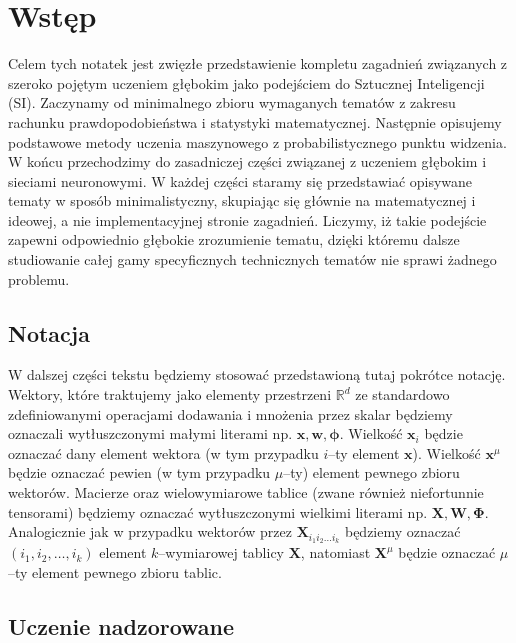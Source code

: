 \documentclass{myclass}
\numberwithin{equation}{subsection}
\begin{document}
\tableofcontents
\newpage

\section{Wstęp}

Celem tych notatek jest zwięzłe przedstawienie kompletu zagadnień związanych z szeroko pojętym
uczeniem głębokim jako podejściem do Sztucznej Inteligencji (SI). Zaczynamy od minimalnego zbioru
wymaganych tematów z zakresu rachunku prawdopodobieństwa i statystyki matematycznej. Następnie
opisujemy podstawowe metody uczenia maszynowego z probabilistycznego punktu widzenia. W końcu
przechodzimy do zasadniczej części związanej z uczeniem głębokim i sieciami neuronowymi. W każdej
części staramy się przedstawiać opisywane tematy w sposób minimalistyczny, skupiając się głównie na
matematycznej i ideowej, a nie implementacyjnej stronie zagadnień. Liczymy, iż takie podejście
zapewni odpowiednio głębokie zrozumienie tematu, dzięki któremu dalsze studiowanie całej gamy
specyficznych technicznych tematów nie sprawi żadnego problemu.


\subsection{Notacja}

W dalszej części tekstu będziemy stosować przedstawioną tutaj pokrótce notację. Wektory, które
traktujemy jako elementy przestrzeni \(\mathbb{R}^d\) ze standardowo zdefiniowanymi operacjami
dodawania i mnożenia przez skalar będziemy oznaczali wytłuszczonymi małymi literami np.
\(\mathbf{x}, \mathbf{w}, \boldsymbol{\phi}\). Wielkość \(\mathbf{x}_i\) będzie oznaczać dany
element wektora (w tym przypadku \(i\)--ty element \(\mathbf{x}\)). Wielkość \(\mathbf{x}^\mu\)
będzie oznaczać pewien (w tym przypadku \(\mu\)--ty) element pewnego zbioru wektorów. Macierze oraz
wielowymiarowe tablice (zwane również niefortunnie tensorami) będziemy oznaczać wytłuszczonymi
wielkimi literami np. \(\mathbf{X}, \mathbf{W}, \boldsymbol{\Phi}\). Analogicznie jak w przypadku
wektorów przez \(\mathbf{X}_{i_1 i_2 \ldots i_k}\) będziemy oznaczać \((i_1,i_2,\ldots,i_k)\)
element \(k\)--wymiarowej tablicy \(\mathbf{X}\), natomiast \(\mathbf{X}^\mu\) będzie oznaczać
\(\mu\)--ty element pewnego zbioru tablic.


\subsection{Uczenie nadzorowane}
\end{document}
